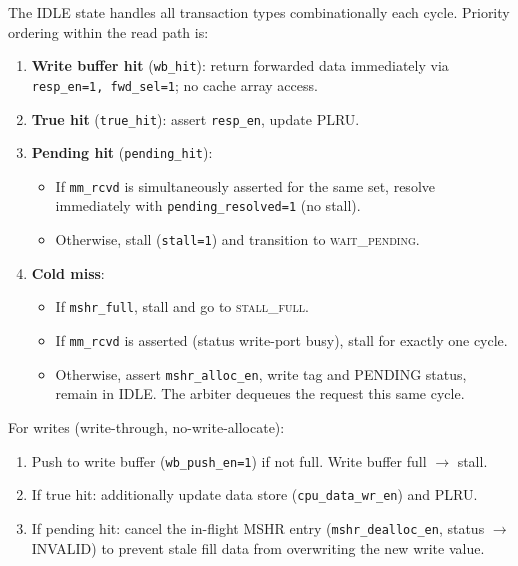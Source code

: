 \documentclass[12pt,letterpaper]{report}
\begin{document}
The IDLE state handles all transaction types combinationally each
cycle.  Priority ordering within the read path is:

\begin{enumerate}[label=\arabic*.]
  \item \textbf{Write buffer hit} (\texttt{wb\_hit}): return forwarded
        data immediately via \texttt{resp\_en=1, fwd\_sel=1}; no cache
        array access.
  \item \textbf{True hit} (\texttt{true\_hit}): assert \texttt{resp\_en},
        update PLRU.
  \item \textbf{Pending hit} (\texttt{pending\_hit}):
        \begin{itemize}
          \item If \texttt{mm\_rcvd} is simultaneously asserted for
                the same set, resolve immediately with
                \texttt{pending\_resolved=1} (no stall).
          \item Otherwise, stall (\texttt{stall=1}) and transition
                to \textsc{wait\_pending}.
        \end{itemize}
  \item \textbf{Cold miss}:
        \begin{itemize}
          \item If \texttt{mshr\_full}, stall and go to
                \textsc{stall\_full}.
          \item If \texttt{mm\_rcvd} is asserted (status write-port
                busy), stall for exactly one cycle.
          \item Otherwise, assert \texttt{mshr\_alloc\_en}, write tag
                and PENDING status, remain in IDLE.  The arbiter
                dequeues the request this same cycle.
        \end{itemize}
\end{enumerate}

For writes (write-through, no-write-allocate):
\begin{enumerate}[label=\arabic*.]
  \item Push to write buffer (\texttt{wb\_push\_en=1}) if not full.
        Write buffer full $\to$ stall.
  \item If true hit: additionally update data store (\texttt{cpu\_data\_wr\_en})
        and PLRU.
  \item If pending hit: cancel the in-flight MSHR entry
        (\texttt{mshr\_dealloc\_en}, status $\to$ INVALID) to prevent
        stale fill data from overwriting the new write value.
\end{enumerate}
\end{document}
